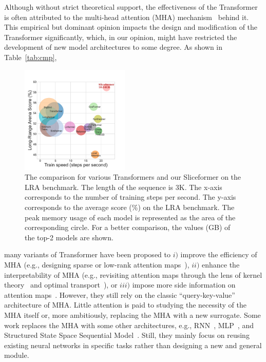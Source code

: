 Although without strict theoretical support, the effectiveness of the Transformer is often attributed to the multi-head attention (MHA) mechanism~\cite{vaswani2017attention} behind it.
This empirical but dominant opinion impacts the design and modification of the Transformer significantly, which, in our opinion, might have restricted the development of new model architectures to some degree.
As shown in Table~\ref{tab:cmp}, 
\begin{figure}
  \centering
    \includegraphics[width=0.46\textwidth]{figures/lra-3.pdf}
    \caption{The comparison for various Transformers and our Sliceformer on the LRA benchmark. 
    The length of the sequence is 3K.
    The x-axis corresponds to the number of training steps per second. 
    The y-axis corresponds to the average score (\%) on the LRA benchmark.
    The peak memory usage of each model is represented as the area of the corresponding circle. 
    For a better comparison, the values (GB) of the top-2 models are shown.}
    \label{fig:cmp}
\end{figure}
many variants of Transformer have been proposed to $i)$ improve the efficiency of MHA (e.g., designing sparse or low-rank attention maps~\cite{child2019generating,kitaev2020reformer,wang2020linformer}), $ii)$ enhance the interpretability of MHA (e.g., revisiting attention maps through the lens of kernel theory~\cite{tsai2019transformer,zhen2022cosformer} and optimal transport~\cite{tay2020sparse,sander2022sinkformers}), or $iii)$ impose more side information on attention maps~\cite{dong2021attention,ying2021transformers,ma2022mega}. 
However, they still rely on the classic ``query-key-value'' architecture of MHA. 
Little attention is paid to studying the necessity of the MHA itself or, more ambitiously, replacing the MHA with a new surrogate. 
Some work replaces the MHA with some other architectures, e.g., RNN~\cite{katharopoulos2020transformers}, MLP~\cite{tolstikhin2021mlp}, and Structured State Space Sequential Model~\cite{gu2021efficiently}. 
Still, they mainly focus on reusing existing neural networks in specific tasks rather than designing a new and general module.




